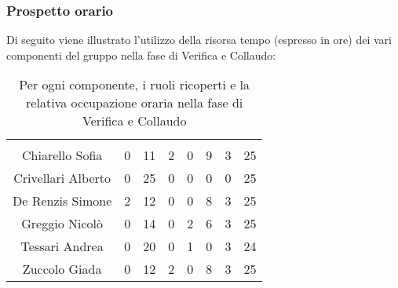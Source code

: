 \subsubsection{Prospetto orario}
Di seguito viene illustrato l'utilizzo della risorsa tempo (espresso in ore) dei vari componenti del gruppo nella fase di Verifica e Collaudo:

\begin{table}[H]
	\begin{center}
		\begin{tabular}{c
				!{\color[HTML]{9b240a}\vrule width 1pt}
				cccccc
				!{\color[HTML]{9b240a}\vrule width 1pt}	
				c}
			\rowcolorhead
			 &  &  &  &  &  &  &  \\
			
			Chiarello Sofia & 0 & 11 & 2 & 0 & 9 & 3 & 25\\
			Crivellari Alberto & 0 & 25 & 0 & 0 & 0 & 0 & 25\\
			De Renzis Simone & 2 & 12 & 0 & 0 & 8 & 3 & 25\\
			Greggio Nicolò & 0 & 14 & 0 & 2 & 6 & 3 & 25\\
			Tessari Andrea & 0 & 20 & 0 & 1 & 0 & 3 & 24\\
			Zuccolo Giada & 0 & 12 & 2 & 0 & 8 & 3 & 25\\
		\end{tabular}
		\caption[Occupazione oraria Verifica e Collaudo]{Per ogni componente, i ruoli ricoperti e la relativa occupazione oraria nella fase di Verifica e Collaudo}
	\end{center}
\end{table}


